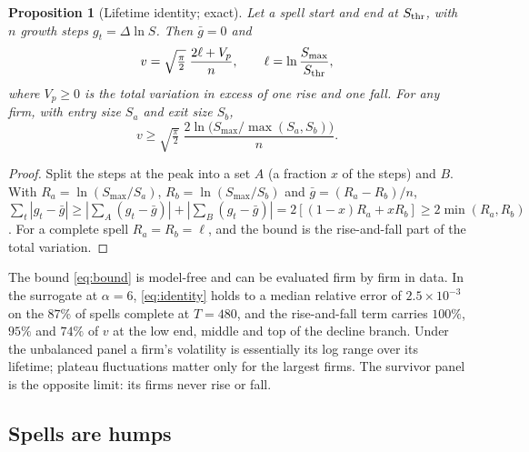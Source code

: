 \documentclass[11pt]{article}
\newcommand{\Sthr}{S_{\rm thr}}
\newtheorem{proposition}{Proposition}
\begin{document}
\begin{proposition}[Lifetime identity; exact]\label{prop:identity}
Let a spell start and end at $\Sthr$, with $n$ growth steps $g_t=\Delta\ln S$.  Then $\bar g=0$ and
\begin{equation}
  v=\sqrt{\tfrac\pi2}\;\frac{2\ell+V_p}{n},\qquad\ell=\ln\frac{S_{\max}}{\Sthr},
  \label{eq:identity}
\end{equation}
where $V_p\ge0$ is the total variation in excess of one rise and one fall.  For any firm, with
entry size $S_a$ and exit size $S_b$,
\begin{equation}
  v\ge\sqrt{\tfrac\pi2}\;\frac{2\ln\bigl(S_{\max}/\max(S_a,S_b)\bigr)}{n}.
  \label{eq:bound}
\end{equation}
\end{proposition}
\begin{proof}
Split the steps at the peak into a set $A$ (a fraction $x$ of the steps) and $B$.  With
$R_a=\ln(S_{\max}/S_a)$, $R_b=\ln(S_{\max}/S_b)$ and $\bar g=(R_a-R_b)/n$,
$\sum_t|g_t-\bar g|\ge|\sum_A(g_t-\bar g)|+|\sum_B(g_t-\bar g)|=2[(1-x)R_a+xR_b]\ge2\min(R_a,R_b)$.  For
a complete spell $R_a=R_b=\ell$, and the bound is the rise-and-fall part of the total variation.
\end{proof}
The bound \eqref{eq:bound} is model-free and can be evaluated firm by firm in data.  In the
surrogate at $\alpha=6$, \eqref{eq:identity} holds to a median relative error of
$2.5\times10^{-3}$ on the $87\%$ of spells complete at $T=480$, and the rise-and-fall term carries
$100\%$, $95\%$ and $74\%$ of $v$ at the low end, middle and top of the decline branch.  Under the
unbalanced panel a firm's volatility is essentially its log range over its lifetime; plateau
fluctuations matter only for the largest firms.  The survivor panel is the opposite limit: its
firms never rise or fall.

\subsection{Spells are humps}
\label{sec:humps}
\end{document}

